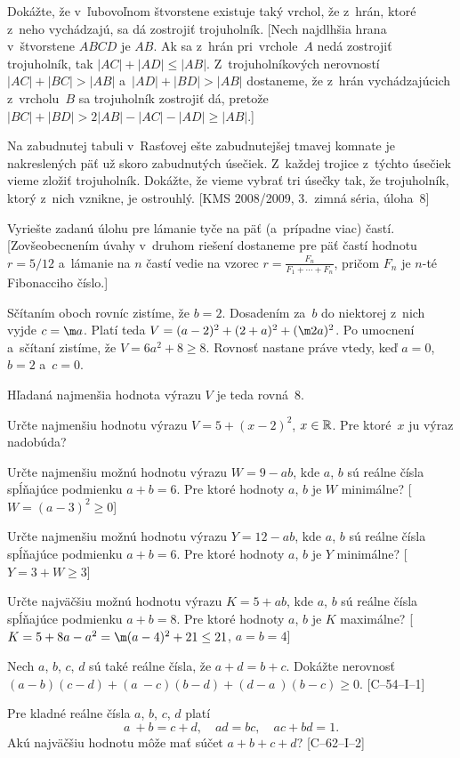 {Dokážte, že v~ľubovoľnom štvorstene existuje taký vrchol, že z~hrán,
ktoré z~neho vychádzajú, sa dá zostrojiť trojuholník. [Nech
najdlhšia hrana v~štvorstene $ABCD$ je $AB$. Ak sa z~hrán pri~vrchole~$A$
nedá zostrojiť trojuholník, tak $|AC|+|AD|\le|AB|$.
Z~trojuholníkových nerovností $|AC|+|BC|>|AB|$ a~$|AD|+|BD|>|AB|$
dostaneme, že z~hrán vychádzajúcich z~vrcholu~$B$ sa trojuholník zostrojiť dá,
pretože $|BC|+|BD|>2|AB|-|AC|-|AD|\ge|AB|$.]

\D
Na zabudnutej tabuli v~Rasťovej ešte zabudnutejšej tmavej komnate je
nakreslených päť už skoro zabudnutých úsečiek. Z~každej trojice
z~týchto úsečiek vieme zložiť trojuholník. Dokážte, že vieme vybrať
tri úsečky tak, že trojuholník, ktorý z~nich vznikne, je ostrouhlý.
[KMS 2008/2009, 3.~zimná séria, úloha~8]

Vyriešte zadanú úlohu pre lámanie tyče na päť (a~prípadne viac)
častí. [Zovšeobecnením úvahy v~druhom riešení dostaneme pre päť
častí hodnotu $r = 5/12$ a~lámanie na $n$ častí vedie na vzorec
$r = \frac {F_n}{F_1 + \cdots + F_n}$, pričom $F_n$ je $n$-té Fibonacciho číslo.]
}

{%
Sčítaním oboch rovníc zistíme, že $b = 2$. Dosadením za~$b$ do niektorej z~nich
vyjde $c = \m a$. Platí teda $V = (a- 2)^2 + (2 + a)^2 + (\m2a)^2$.
Po umocnení a~sčítaní zistíme, že
$V = 6a^2 + 8\ge8$. Rovnosť nastane práve vtedy, keď $a = 0$, $ b = 2$ a~$c = 0$.

Hľadaná najmenšia hodnota výrazu $V$ je teda rovná~$8$.

Určte najmenšiu hodnotu výrazu $V = 5 + ( x - 2)^2 $, $x\in\Bbb R$.
  Pre ktoré~$x$ ju výraz nadobúda?

Určte najmenšiu možnú hodnotu výrazu $W = 9 - ab$,
  kde $a$, $b$ sú reálne čísla spĺňajúce podmienku $a + b = 6$.
  Pre ktoré hodnoty $a$, $b$ je $W$ minimálne?
  [$W=(a-3)^2\ge0$]

Určte najmenšiu možnú hodnotu výrazu $Y = 12 - ab$,
  kde $a$, $b$ sú reálne čísla spĺňajúce podmienku $a + b = 6$.
  Pre ktoré hodnoty $a$, $ b$ je $Y$ minimálne?
  [$Y=3+W\ge3$]

Určte najväčšiu možnú hodnotu výrazu $K = 5 + ab$,
  kde $a$, $b$ sú reálne čísla spĺňajúce podmienku $a + b = 8$.
  Pre ktoré hodnoty $a$, $b$ je $K$ maximálne?
  [$K=5+8a-a^2=\m(a-4)^2+21\le21$, $a=b=4$]

Nech $a$, $b$, $c$, $d$ sú také reálne čísla, že $a + d = b + c$.
  Dokážte nerovnosť $(a - b)(c - d ) + (a~- c)(b - d ) + (d - a~)(b - c)\ge0$.
   [C--54--I--1]

Pre kladné reálne čísla $a$, $b$, $c$, $d$ platí
$$
a~+ b = c + d,\quad ad = bc,\quad ac + bd = 1.
$$
Akú najväčšiu hodnotu môže mať súčet $a + b + c + d$? [C--62--I--2]
}

